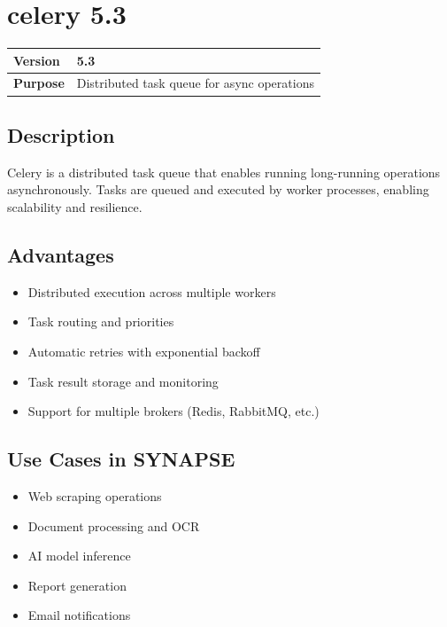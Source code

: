 \documentclass[12pt,a4paper]{report}
\begin{document}
\section{celery 5.3}

\begin{tabular}{|p{4cm}|p{10cm}|}
\hline
\textbf{Version} & 5.3 \\
\hline
\textbf{Purpose} & Distributed task queue for async operations \\
\hline
\end{tabular}

\subsection{Description}

Celery is a distributed task queue that enables running long-running operations asynchronously. Tasks are queued and executed by worker processes, enabling scalability and resilience.

\subsection{Advantages}

\begin{itemize}
    \item Distributed execution across multiple workers
    \item Task routing and priorities
    \item Automatic retries with exponential backoff
    \item Task result storage and monitoring
    \item Support for multiple brokers (Redis, RabbitMQ, etc.)
\end{itemize}

\subsection{Use Cases in SYNAPSE}

\begin{itemize}
    \item Web scraping operations
    \item Document processing and OCR
    \item AI model inference
    \item Report generation
    \item Email notifications
\end{itemize}
\end{document}
